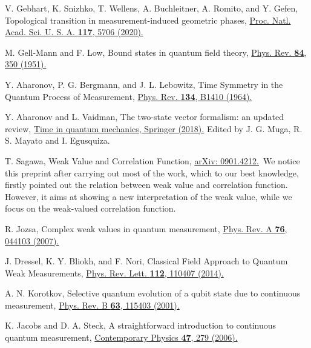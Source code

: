 \documentclass[twocolumn,pra,aps,superscriptaddress]{revtex4-2}
\begin{document}
\begin{thebibliography}{99}
 V. Gebhart, K. Snizhko, T. Wellens, A. Buchleitner, A. Romito, and Y. Gefen, Topological transition in measurement-induced geometric phases, \href{https://www.pnas.org/doi/10.1073/pnas.1911620117}{Proc. Natl. Acad. Sci. U. S. A. \textbf{117}, 5706 (2020).}

 M. Gell-Mann and F. Low, Bound states in quantum field theory, \href{https://journals.aps.org/pr/abstract/10.1103/PhysRev.84.350}{Phys. Rev. \textbf{84}, 350 (1951).}

 Y. Aharonov, P. G. Bergmann, and J. L. Lebowitz, Time Symmetry in the Quantum Process of Measurement, \href{https://journals.aps.org/pr/abstract/10.1103/PhysRev.134.B1410}{Phys. Rev. \textbf{134}, B1410 (1964).}

 Y. Aharonov and L. Vaidman, The two-state vector formalism: an updated review, \href{https://arxiv.org/pdf/quant-ph/0105101.pdf}{Time in quantum mechanics, Springer (2018).} Edited by J. G. Muga, R. S. Mayato and I. Egusquiza.

 T. Sagawa, Weak Value and Correlation Function, \href{https://arxiv.org/pdf/0901.4212.pdf}{arXiv: 0901.4212.}~We notice this preprint after carrying out most of the work, which to our best knowledge, firstly pointed out the relation between weak value and correlation function. However, it aims at showing a new interpretation of the weak value, while we focus on the weak-valued correlation function.

 R. Jozsa, Complex weak values in quantum measurement, \href{https://journals.aps.org/pra/abstract/10.1103/PhysRevA.76.044103}{Phys. Rev. A \textbf{76}, 044103 (2007).}

 J. Dressel, K. Y. Bliokh, and F. Nori, Classical Field Approach to Quantum Weak Measurements, \href{https://journals.aps.org/prl/abstract/10.1103/PhysRevLett.112.110407}{Phys. Rev. Lett. \textbf{112}, 110407 (2014).}

 A. N. Korotkov, Selective quantum evolution of a qubit state due to continuous measurement, \href{https://journals.aps.org/prb/abstract/10.1103/PhysRevB.63.115403}{Phys. Rev. B \textbf{63}, 115403 (2001).}

 K. Jacobs and D. A. Steck, A straightforward introduction to continuous quantum measurement,  \href{https://www.tandfonline.com/doi/abs/10.1080/00107510601101934}{Contemporary Physics \textbf{47}, 279 (2006).}


\end{thebibliography}
\end{document}
